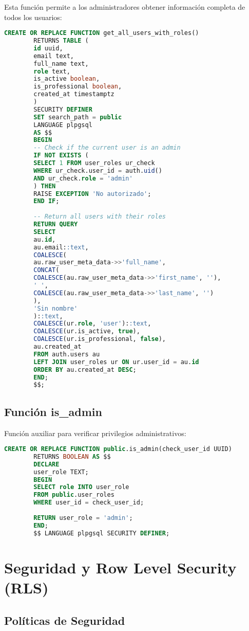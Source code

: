 \documentclass[12pt,a4paper]{article}
\begin{document}
	Esta función permite a los administradores obtener información completa de todos los usuarios:
	
	\begin{lstlisting}[language=SQL, caption=Función get\_all\_users\_with\_roles]
		CREATE OR REPLACE FUNCTION get_all_users_with_roles()
		RETURNS TABLE (
		id uuid,
		email text,
		full_name text,
		role text,
		is_active boolean,
		is_professional boolean,
		created_at timestamptz
		)
		SECURITY DEFINER
		SET search_path = public
		LANGUAGE plpgsql
		AS $$
		BEGIN
		-- Check if the current user is an admin
		IF NOT EXISTS (
		SELECT 1 FROM user_roles ur_check
		WHERE ur_check.user_id = auth.uid() 
		AND ur_check.role = 'admin'
		) THEN
		RAISE EXCEPTION 'No autorizado';
		END IF;
		
		-- Return all users with their roles
		RETURN QUERY
		SELECT 
		au.id,
		au.email::text,
		COALESCE(
		au.raw_user_meta_data->>'full_name',
		CONCAT(
		COALESCE(au.raw_user_meta_data->>'first_name', ''),
		' ',
		COALESCE(au.raw_user_meta_data->>'last_name', '')
		),
		'Sin nombre'
		)::text,
		COALESCE(ur.role, 'user')::text,
		COALESCE(ur.is_active, true),
		COALESCE(ur.is_professional, false),
		au.created_at
		FROM auth.users au
		LEFT JOIN user_roles ur ON ur.user_id = au.id
		ORDER BY au.created_at DESC;
		END;
		$$;
	\end{lstlisting}
	
	\subsection{Función is\_admin}
	
	Función auxiliar para verificar privilegios administrativos:
	
	\begin{lstlisting}[language=SQL, caption=Función is\_admin]
		CREATE OR REPLACE FUNCTION public.is_admin(check_user_id UUID)
		RETURNS BOOLEAN AS $$
		DECLARE
		user_role TEXT;
		BEGIN
		SELECT role INTO user_role
		FROM public.user_roles
		WHERE user_id = check_user_id;
		
		RETURN user_role = 'admin';
		END;
		$$ LANGUAGE plpgsql SECURITY DEFINER;
	\end{lstlisting}
	
	\section{Seguridad y Row Level Security (RLS)}
	
	\subsection{Políticas de Seguridad}
	
\end{document}

